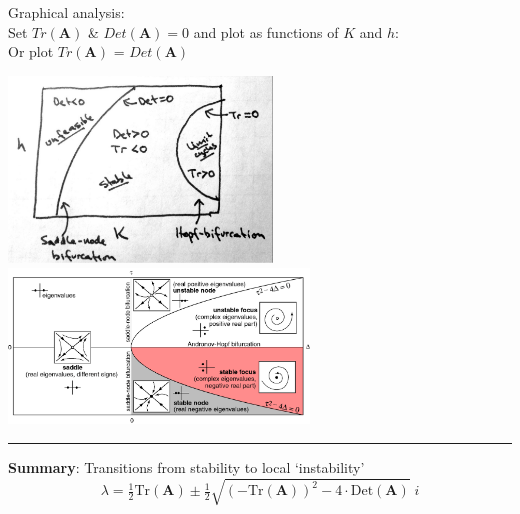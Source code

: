 \documentclass{article}
\newcommand{\ind}{\-\hspace{1cm}}
\begin{document}
Graphical analysis:\\
\ind Set $Tr(\mathbf{A})$ \& $Det(\mathbf{A})=0$ and plot as functions of $K$ and $h$:\\
\ind Or plot $Tr(\mathbf{A})$ = $Det(\mathbf{A})$
\begin{center}
 	\includegraphics[width=7cm]{figs/h_v_K.pdf}
  	\includegraphics[width=8cm]{figs/Tr_v_Det.png}
\end{center}

\rule[0.5ex]{\linewidth}{1pt}

\textbf{Summary}: Transitions from stability to local `instability'
\begin{equation*}
	\lambda = \tfrac{1}{2}\text{Tr}(\textbf{A}) \pm \tfrac{1}{2}\sqrt{(-\text{Tr}(\textbf{A}))^2 - 4\cdot\text{Det}(\textbf{A})} \; i
\end{equation*}
\end{document}
